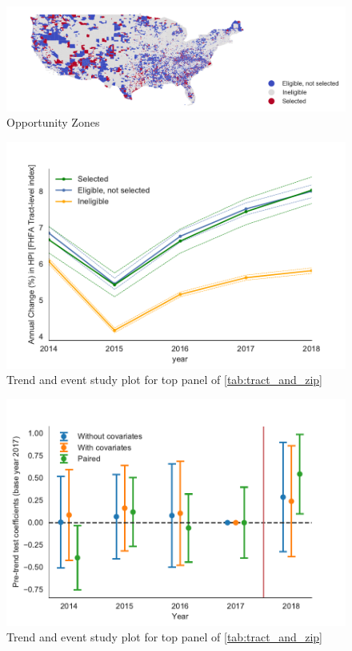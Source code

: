 \documentclass[10pt]{article}
\begin{document}
\begin{figure}[tb]
\centering
\includegraphics[width=1\textwidth]{../exhibits/map.png}
\caption{Opportunity Zones}
\label{fig:map}
\end{figure}


\begin{figure}[tb]
\centering
\includegraphics[width=\textwidth]{../exhibits/zillow_raw_trend.pdf}
\caption{Trend and event study plot for top panel of  
\cref{tab:tract_and_zip}}
\label{fig:raw_trend}
\end{figure}

\begin{figure}[tb]
\centering
\includegraphics[width=\textwidth]{../exhibits/zillow_pretest_event_study_plot.pdf}
\caption{Trend and event study plot for top panel of  
\cref{tab:tract_and_zip}}
\label{fig:zillow_event_study}
\end{figure}
\end{document}
